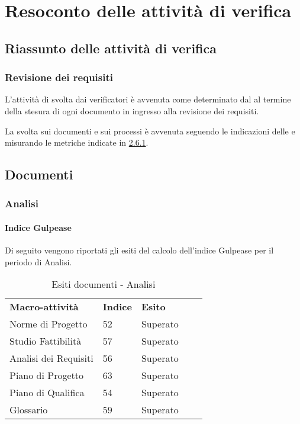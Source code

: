 \newpage
\section{Resoconto delle attività di verifica} \label{App:AppendixA}
	\subsection{Riassunto delle attività di verifica} \label{App:AppendixA}
		\subsubsection{Revisione dei requisiti} \label{App:AppendixA}
			
			L'attività di  svolta dai verificatori è avvenuta come determinato dal \PianoDiProgetto al termine della stesura di ogni documento in ingresso alla revisione dei requisiti.
			
			La  svolta sui documenti e sui processi è avvenuta seguendo le indicazioni delle \NormeDiProgetto e misurando le metriche indicate in \hyperlink{metriche_documenti}{2.6.1}.
\subsection{Documenti} \label{App:AppendixB} 
\subsubsection{Analisi}
\paragraph*{Indice Gulpease}
Di seguito vengono riportati gli esiti del calcolo dell'indice Gulpease per il periodo di Analisi.
		\begin{table}[H]
			\centering
				\begin{tabular}{|l|l|l|ll}
					\cline{1-3}
					 \textbf{Macro-attività}  & \textbf{Indice \glossaryItem{Gulpease}}  & \textbf{Esito}  &  \\ \cline{1-3}
					 Norme di Progetto  & 52 & Superato &  \\ \cline{1-3}
					 Studio Fattibilità & 57 & Superato &  \\ \cline{1-3}
					 Analisi dei Requisiti & 56 & Superato &  \\ \cline{1-3}
					 Piano di Progetto & 63 & Superato &  \\ \cline{1-3}
					 Piano di Qualifica & 54 & Superato &  \\ \cline{1-3}
					 Glossario & 59 & Superato &  \\ \cline{1-3}
				\end{tabular}
				\caption{Esiti  documenti - Analisi}
		\end{table}

